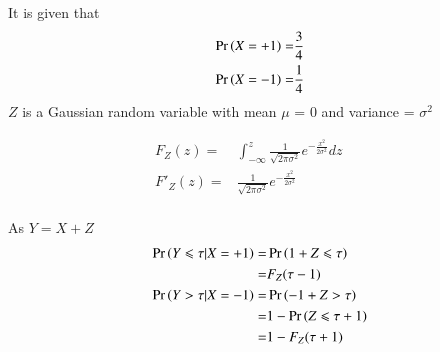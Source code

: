 

It is given that
\begin{align}
    \Pr\left(X=+1\right)=&\frac{3}{4}
    \\\Pr\left(X=-1\right)=&\frac{1}{4}
\end{align}
 $Z$ is a Gaussian random variable with mean  $\mu$ = 0 and variance = $\sigma^2$


\begin{align}
    F_Z(z) =&  \int_{-\infty}^{z}{\frac{1}{\sqrt{2\pi\sigma^2}}e^{-\frac{x^2}{2\sigma^2}}dz}& &
    \\F'_Z(z) =& \frac{1}{\sqrt{2\pi\sigma^2}}e^{-\frac{x^2}{2\sigma^2}}& &
\end{align}
\\As $Y=X+Z$
\begin{align}
    \pr{Y\leqslant \tau |X=+1}=&\pr{1+Z\leqslant \tau }
    \\ =& F_Z(\tau-1)
    \label{ec44:eqn_1}
    \\ \pr{Y>\tau|X=-1}=& \pr{-1+Z>\tau}
    \\=& 1-\pr{Z\leqslant\tau+1}
    \\=& 1- F_Z(\tau+1)
    \label{ec44:eqn_2}
\end{align}


